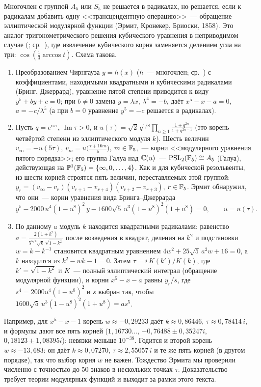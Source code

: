 \begin{aside}
Многочлен с группой $A_5$ или $S_5$ не решается в радикалах, но решается, если к радикалам добавить одну
<<трансцендентную операцию>>~--- обращение эллиптической модулярной функции (Эрмит, Кронекер, Бриоски, 1858). Это
аналог тригонометрического решения кубического уравнения в неприводимом случае (; ср.\ ), где извлечение кубического
корня заменяется делением угла на три: $\cos(\frac13\arccos t)$. Схема такова.
\begin{enumerate}[label=(\arabic*),leftmargin=*]
\item Преобразованием Чирнгауза $y=h(x)$ ($h$~--- многочлен; ср.\ ) с коэффициентами, находимыми квадратными и кубическими радикалами
(Бринг, Джеррард), уравнение пятой степени приводится к виду $y^5+by+c=0$; при $b\ne0$ замена $y=\lambda x$, $\lambda^4=-b$,
даёт $x^5-x-a=0$, $a=-c/\lambda^5$ (а при $b=0$ уравнение $y^5=-c$ решается в радикалах).
\item Пусть $q=e^{i\pi\tau}$, $\operatorname{Im}\tau>0$, и $u(\tau)=\sqrt2\,q^{1/8}\prod_{n\ge1}\frac{1+q^{2n}}{1+q^{2n-1}}$ (это корень
четвёртой степени из эллиптического модуля $k$). Шесть величин $v_\infty=-u(5\tau)$, $v_m=u\bigl(\frac{\tau+16m}5\bigr)$,
$m\in\mathbb F_5$,~--- корни <<модулярного уравнения пятого порядка>>; его группа Галуа над $\mathbb C(u)$~--- $\mathrm{PSL}_2(\mathbb F_5)\cong A_5$ (Галуа),
действующая на $\mathbb P^1(\mathbb F_5)=\{\infty,0,\dots,4\}$. Как и для кубической резольвенты, из шести корней строятся пять
величин, переставляемых этой группой: $y_r=(v_\infty-v_r)(v_{r+1}-v_{r+4})(v_{r+2}-v_{r+3})$, $r\in\mathbb F_5$. Эрмит
обнаружил, что они~--- корни уравнения вида Бринга--Джеррарда
\[
y^5-2000\,u^4(1-u^8)^2\,y-1600\sqrt5\,u^3(1-u^8)^2(1+u^8)=0,\qquad u=u(\tau).
\]
\item По данному $a$ модуль $k$ находится квадратными радикалами: равенство
$a=\frac{2(1+k^2)}{5^{5/4}\sqrt k\,\sqrt{1-k^2}}$ после возведения в квадрат, деления на $k^2$ и подстановки $w=k-k^{-1}$
становится квадратным уравнением $4w^2+25\sqrt5\,a^2w+16=0$, а $k$ находится из $k^2-wk-1=0$. Затем $\tau=i\,K(k')/K(k)$, где $k'=\sqrt{1-k^2}$ и $K$~--- полный эллиптический интеграл
(обращение модулярной функции), и корни $x^5-x-a$ равны $y_r/s$, где $s^4=2000u^4(1-u^8)^2$ и $s$ выбран так, чтобы
$1600\sqrt5\,u^3(1-u^8)^2(1+u^8)=a s^5$.
\end{enumerate}
Например, для $x^5-x-1$ корень $w\approx-0{,}29233$ даёт $k\approx0{,}86446$, $\tau\approx0{,}78414\,i$, и формулы дают все
пять корней ($1{,}16730\dots$, $-0{,}76488\pm0{,}35247i$, $0{,}18123\pm1{,}08395i$); невязки меньше $10^{-38}$. Годится и
второй корень $w\approx-13{,}683$: он даёт $k\approx0{,}07270$, $\tau\approx2{,}55057\,i$ и те же пять корней (в другом
порядке), так что выбор корня $w$ не важен. Тождество Эрмита мы проверили численно с точностью до $50$ знаков в
нескольких точках $\tau$. Доказательство требует теории модулярных функций и выходит за рамки этого текста.
\end{aside}

